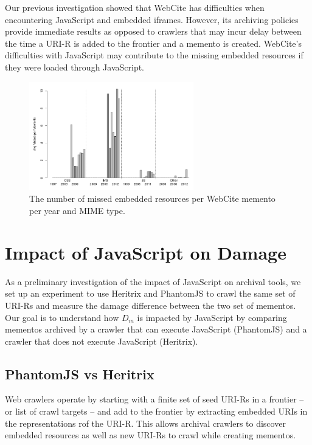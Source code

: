 Our previous investigation \cite{ijdl} showed that WebCite has difficulties when encountering JavaScript and embedded iframes. However, its archiving policies provide immediate results as opposed to crawlers that may incur delay between the time a URI-R is added to the frontier and a memento is created. WebCite's difficulties with JavaScript may contribute to the missing embedded resources if they were loaded through JavaScript.


\begin{figure}[h!]
\includegraphics[width=270px]{./imgs/FileTypes_webcite.png}
\caption{The number of missed embedded resources per WebCite memento per year and MIME type.
}
\label{occstatsWC}
\end{figure}


\section{Impact of JavaScript on Damage}
\label{wcjs}


As a preliminary investigation of the impact of JavaScript on archival tools, we set up an experiment to use Heritrix and PhantomJS \cite{pjs} to crawl the same set of URI-Rs and measure the damage difference between the two set of mementos. Our goal is to understand how $D_m$ is impacted by JavaScript by comparing mementos archived by a crawler that can execute JavaScript (PhantomJS) and a crawler that does not execute JavaScript (Heritrix).

\subsection{PhantomJS vs Heritrix}
\label{pjsvhtrix}
Web crawlers operate by starting with a finite set of seed URI-Rs in a frontier -- or list of crawl targets -- and add to the frontier by extracting embedded URIs in the representations rof the URI-R. This allows archival crawlers to discover embedded resources as well as new URI-Rs to crawl while creating mementos. 

